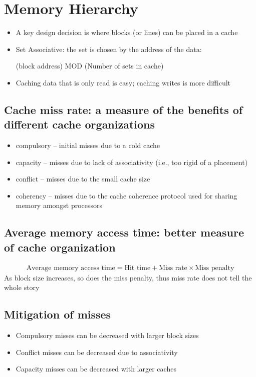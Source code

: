 \documentclass[11pt]{article}
\begin{document}
\section{Memory Hierarchy}
\begin{itemize}
    \item A key design decision is where blocks (or lines) can be placed in a cache
    \item Set Associative: the set is chosen by the address of the data:
    \begin{center}
        (block address) MOD (Number of sets in cache)
    \end{center}
    
    \item Caching data that is only read is easy; caching writes is more difficult
\end{itemize}
\subsection {Cache miss rate: a measure of the benefits of different cache organizations}
    \begin{itemize}
        \item compulsory -- initial misses due to a cold cache
        \item capacity -- misses due to lack of associativity (i.e., too rigid of a placement)
        \item conflict -- misses due to the small cache size
        \item coherency -- misses due to the cache coherence protocol used for sharing memory amongst processors
    \end{itemize}
\subsection {Average memory access time: better measure of cache organization}
    \begin{align*}
        \text{Average memory access time} = \text{Hit time} + \text{Miss rate} \times \text{Miss penalty}
    \end{align*}
As block size increases, so does the miss penalty, thus miss rate does not tell the whole story
    

\subsection {Mitigation of misses}
    \begin{itemize}
        \item Compulsory misses can be decreased with larger block sizes
        \item Conflict misses can be decreased due to associativity
        \item Capacity misses can be decreased with larger caches
    \end{itemize}
\end{document}
